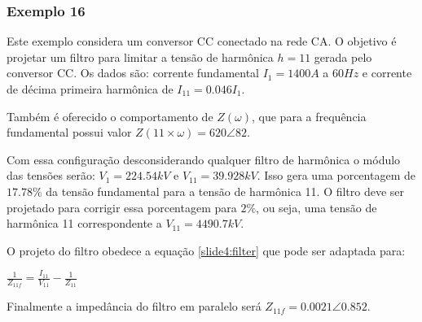 \subsubsection*{Exemplo 16}

Este exemplo considera um conversor CC conectado na rede CA. O objetivo é projetar um filtro para limitar a tensão de harmônica $h=11$ gerada pelo conversor CC. Os dados são: corrente fundamental $I_1 = 1400 A$ a $60 Hz$ e corrente de décima primeira harmônica de $I_{11} = 0.046I_1$. 

Também é oferecido o comportamento de $Z(\omega)$, que para a frequência fundamental possui valor $Z(11\times \omega) = 620 \angle 82$.

Com essa configuração desconsiderando qualquer filtro de harmônica o módulo das tensões serão: $V_1 = 224.54 kV$ e $V_{11} = 39.928 kV$. Isso gera uma porcentagem de $17.78\%$ da tensão fundamental para a tensão de harmônica 11. O filtro deve ser projetado para corrigir essa porcentagem para $2\%$, ou seja, uma tensão de harmônica 11 correspondente a $V_{11} = 4490.7 kV$.

O projeto do filtro obedece a equação \ref{slide4:filter} que pode ser adaptada para:

\begin{center}
    $\frac{1}{Z_{11f}} = \frac{I_{11}}{V_{11}} - \frac{1}{Z_{11}}$
\end{center}

Finalmente a impedância do filtro em paralelo será $Z_{11f} = 0.0021 \angle 0.852$.



\newpage

